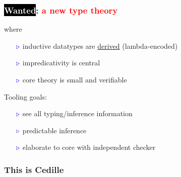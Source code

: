 \documentclass[11pt]{beamer}
\newcommand{\myb}[0]{\ensuremath{\textcolor{blue}{\triangleright}}}
\begin{document}
\begin{frame}
  \frametitle{\colorbox{black}{\textcolor{white}{Wanted}}: \textcolor{red}{a new type theory} }

  where

  \begin{itemize}
  \item[$\myb$] inductive datatypes are \underline{derived} (lambda-encoded)
  \item[$\myb$] impredicativity is central
  \item[$\myb$] core theory is small and verifiable
  \end{itemize}

\vspace{.15cm}

  Tooling goals:

  \begin{itemize}
  \item[$\myb$] see all typing/inference information 
  \item[$\myb$] predictable inference
  \item[$\myb$] elaborate to core with independent checker
  \end{itemize}

\end{frame}

\begin{frame}
  \frametitle{This is Cedille}

  \end{frame}
\end{document}
